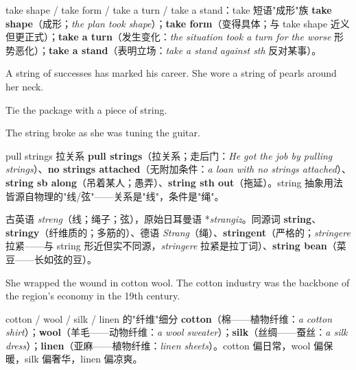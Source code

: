 \documentclass[../main.tex]{subfiles}
\begin{document}


\begin{gram}{take shape / take form / take a turn / take a stand：take 短语"成形"族}
\textbf{take shape}（成形；\textit{the plan took shape}）；\textbf{take form}（变得具体；与 take shape 近义但更正式）；\textbf{take a turn}（发生变化：\textit{the situation took a turn for the worse} 形势恶化）；\textbf{take a stand}（表明立场：\textit{take a stand against sth} 反对某事）。
\end{gram}


{A string of successes has marked his career.}
{She wore a string of pearls around her neck.}

{Tie the package with a piece of string.}

{The string broke as she was tuning the guitar.}

\begin{gram}{pull strings 拉关系}
\textbf{pull strings}（拉关系；走后门：\textit{He got the job by pulling strings}）、\textbf{no strings attached}（无附加条件：\textit{a loan with no strings attached}）、\textbf{string sb along}（吊着某人；愚弄）、\textbf{string sth out}（拖延）。string 抽象用法皆源自物理的"线/弦"——关系是"线"，条件是"绳"。
\end{gram}

\begin{origin}
古英语 \textit{streng}（线；绳子；弦），原始日耳曼语 *\textit{strangiz}。同源词 \textbf{string}、\textbf{stringy}（纤维质的；多筋的）、德语 \textit{Strang}（绳）、\textbf{stringent}（严格的；\textit{stringere} 拉紧——与 string 形近但实不同源，\textit{stringere} 拉紧是拉丁词）、\textbf{string bean}（菜豆——长如弦的豆）。
\end{origin}


{She wrapped the wound in cotton wool.}
{The cotton industry was the backbone of the region's economy in the 19th century.}

\begin{lex}{cotton / wool / silk / linen 的"纤维"细分}
\textbf{cotton}（棉——植物纤维：\textit{a cotton shirt}）；\textbf{wool}（羊毛——动物纤维：\textit{a wool sweater}）；\textbf{silk}（丝绸——蚕丝：\textit{a silk dress}）；\textbf{linen}（亚麻——植物纤维：\textit{linen sheets}）。cotton 偏日常，wool 偏保暖，silk 偏奢华，linen 偏凉爽。
\end{lex}
\end{document}
